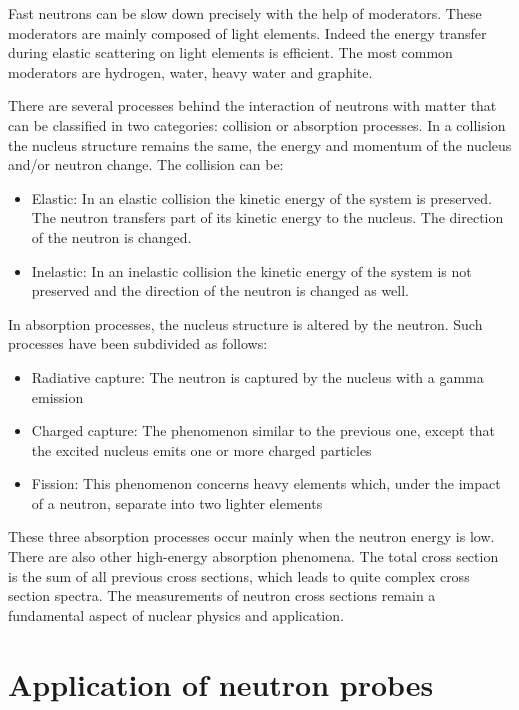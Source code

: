 \begin{refsection}
  

  Fast neutrons can be slow down precisely with the help of moderators. These moderators are mainly composed of light elements. Indeed the energy transfer during elastic scattering on light elements is efficient. The most common moderators are hydrogen, water, heavy water and graphite.

  There are several processes behind the interaction of neutrons with matter \cite{Leo1994} that can be classified in two categories: collision or absorption processes.
  In a collision the nucleus structure remains the same, the energy and momentum of the nucleus and/or neutron change. The collision can be:
  \begin{itemize}
    \item Elastic: In an elastic collision the kinetic energy of the system is preserved. The neutron transfers part of its kinetic energy to the nucleus. The direction of the neutron is changed.
    \item Inelastic: In an inelastic collision the kinetic energy of the system is not preserved and the direction of the neutron is changed as well.
  \end{itemize}
  In absorption processes, the nucleus structure is altered by the neutron.
  Such processes have been subdivided as follows:
  \begin{itemize}
    \item Radiative capture: The neutron is captured by the nucleus with a gamma emission
    \item Charged capture: The phenomenon similar to the previous one, except that the excited nucleus emits one or more charged particles
    \item Fission: This phenomenon concerns heavy elements which, under the impact of a neutron, separate into two lighter elements
  \end{itemize}
  These three absorption processes occur mainly when the neutron energy is low. There are also other high-energy absorption phenomena. The total cross section is the sum of all previous cross sections, which leads to quite complex cross section spectra. The measurements of neutron cross sections remain a fundamental aspect of nuclear physics and application.

  \section{Application of neutron probes}
  

\end{refsection}
